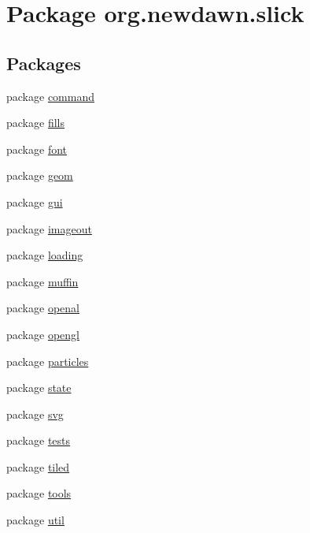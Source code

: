 \hypertarget{namespaceorg_1_1newdawn_1_1slick}{}\section{Package org.\+newdawn.\+slick}
\label{namespaceorg_1_1newdawn_1_1slick}
\subsection*{Packages}
\begin{DoxyCompactItemize}
\item 
package \mbox{\hyperlink{namespaceorg_1_1newdawn_1_1slick_1_1command}{command}}
\item 
package \mbox{\hyperlink{namespaceorg_1_1newdawn_1_1slick_1_1fills}{fills}}
\item 
package \mbox{\hyperlink{namespaceorg_1_1newdawn_1_1slick_1_1font}{font}}
\item 
package \mbox{\hyperlink{namespaceorg_1_1newdawn_1_1slick_1_1geom}{geom}}
\item 
package \mbox{\hyperlink{namespaceorg_1_1newdawn_1_1slick_1_1gui}{gui}}
\item 
package \mbox{\hyperlink{namespaceorg_1_1newdawn_1_1slick_1_1imageout}{imageout}}
\item 
package \mbox{\hyperlink{namespaceorg_1_1newdawn_1_1slick_1_1loading}{loading}}
\item 
package \mbox{\hyperlink{namespaceorg_1_1newdawn_1_1slick_1_1muffin}{muffin}}
\item 
package \mbox{\hyperlink{namespaceorg_1_1newdawn_1_1slick_1_1openal}{openal}}
\item 
package \mbox{\hyperlink{namespaceorg_1_1newdawn_1_1slick_1_1opengl}{opengl}}
\item 
package \mbox{\hyperlink{namespaceorg_1_1newdawn_1_1slick_1_1particles}{particles}}
\item 
package \mbox{\hyperlink{namespaceorg_1_1newdawn_1_1slick_1_1state}{state}}
\item 
package \mbox{\hyperlink{namespaceorg_1_1newdawn_1_1slick_1_1svg}{svg}}
\item 
package \mbox{\hyperlink{namespaceorg_1_1newdawn_1_1slick_1_1tests}{tests}}
\item 
package \mbox{\hyperlink{namespaceorg_1_1newdawn_1_1slick_1_1tiled}{tiled}}
\item 
package \mbox{\hyperlink{namespaceorg_1_1newdawn_1_1slick_1_1tools}{tools}}
\item 
package \mbox{\hyperlink{namespaceorg_1_1newdawn_1_1slick_1_1util}{util}}
\end{DoxyCompactItemize}
